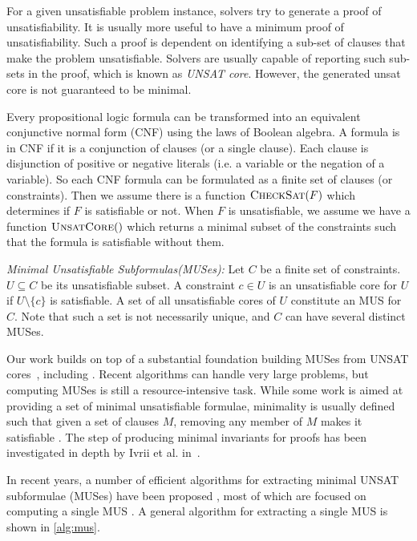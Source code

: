 For a given unsatisfiable problem instance, solvers try to generate a proof of unsatisfiability. It is usually more useful to have a minimum proof of unsatisfiability. Such a proof is dependent on identifying a sub-set of clauses that make the problem unsatisfiable. Solvers are usually capable of reporting such sub-sets in the proof, which is known as \emph{UNSAT core}. However, the generated unsat core is not guaranteed to be minimal.

Every propositional logic formula can be transformed into an equivalent conjunctive normal form (CNF) using the laws of Boolean algebra. A formula is in CNF if it is a conjunction of clauses (or a single clause). Each clause is disjunction of positive or negative literals (i.e. a variable or the negation of a variable). So each CNF formula can be formulated as a finite set of clauses (or constraints). Then we assume there is a function $\textsc{CheckSat}(F)$ which determines if $F$ is satisfiable or not.
When $F$ is unsatisfiable, we assume we
have a function $\textsc{UnsatCore}()$ which returns a minimal subset of the
constraints such that the formula is satisfiable without them.

\begin{definition}{\emph{Minimal Unsatisfiable Subformulas(MUSes):}}
  \label{def:mus}
  Let $C$ be a finite set of constraints.
  $U \subseteq C$ be its unsatisfiable subset.
  A constraint $c \in U$ is an
  unsatisfiable core for $U$ if $U \setminus \{c\}$ is satisfiable.
  A set of all unsatisfiable cores of $U$ constitute
  an MUS for $C$.
  Note that such a set is not necessarily unique, and $C$ can have several distinct MUSes.
\end{definition}

Our work builds on top of a substantial foundation building
MUSes from UNSAT cores~\cite{Cimatti2007:UNSAT}, including \cite{marques2010minimal, belov2012towards, ryvchin2011faster, belov2012computing, nadel2010boosting}.  Recent algorithms can handle very large problems, but computing MUSes is still a resource-intensive task.  While some work is aimed at providing a set of minimal unsatisfiable formulae, minimality is usually defined such that given a set of clauses $M$, removing any member of $M$ makes it satisfiable \cite{belov2012computing}.  The step of producing minimal invariants for proofs has been investigated in depth by Ivrii et al. in~\cite{Ivrii14:invariants}.

In  recent  years,  a  number  of  efficient algorithms  for  extracting minimal UNSAT subformulae (MUSes)  have  been proposed \cite{liffiton2005max},
most of which are focused on computing a single MUS  \cite{bacchus2015using, belov2012muser2, belov2013core, belov2012towards, nadel2014accelerated}. A general algorithm for extracting a single MUS is shown in \ref{alg:mus}.


